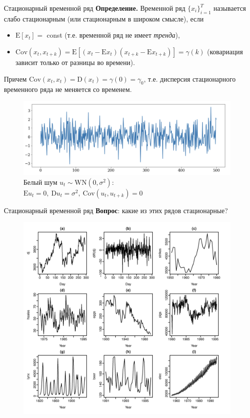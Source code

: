 \begin{frame}{Стационарный временной ряд}
\textbf{Определение.} Временной ряд $\{x_i\}_{i=1}^{T}$ называется слабо стационарным (или стационарным в широком смысле), если
\begin{itemize}
    \item $\mathrm{E}[x_t]=$ const (т.е. временной ряд не имеет \textit{тренда}),
    \item $\mathrm{Cov}(x_t,x_{t+k}) = \mathrm{E}[(x_t - \mathrm{E}x_t)(x_{t+k} - \mathrm{E}x_{t+k})] = \gamma(k)$ (ковариация зависит только от разницы во времени).
\end{itemize}
Причем $\mathrm{Cov}(x_t,x_{t}) = \mathrm{D}(x_t) = \gamma(0) = \gamma_0$, т.е. дисперсия стационарного временного ряда не меняется со временем.
\begin{figure}
    \centering
    \includegraphics[width=0.9\linewidth]{lecture_2/fig/noise.png}
    \caption{Белый шум $u_t \sim \text{WN}(0, \sigma^2)$: $\mathrm{E}u_t = 0, \ \mathrm{D}u_t = \sigma^2, \ \mathrm{Cov}(u_t, u_{t + k}) = 0$}
\end{figure}
\end{frame}
\begin{frame}{Стационарный временной ряд}
\textbf{Вопрос}: какие из этих рядов стационарные?
\begin{figure}
    \centering
    \includegraphics[width=0.8\linewidth]{lecture_2/fig/ts_stationary.png}
\end{figure}
\end{frame}
